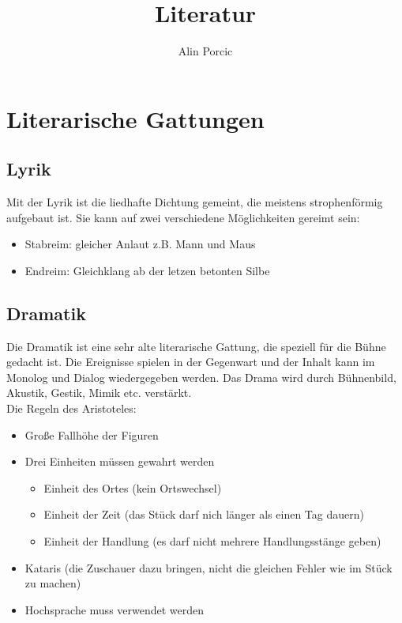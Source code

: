 \documentclass[12pt,a4paper]{article}
\title{Literatur}
\author{Alin Porcic}
\begin{document}
\maketitle
\newpage
\tableofcontents
\newpage

\section{Literarische Gattungen}
\subsection{Lyrik}

Mit der Lyrik ist die liedhafte Dichtung gemeint, die meistens strophenförmig aufgebaut ist. Sie kann auf zwei verschiedene Möglichkeiten gereimt sein:
	\begin{itemize}
	\item Stabreim: gleicher Anlaut z.B. Mann und Maus
	\item Endreim: Gleichklang ab der letzen betonten Silbe
	\end{itemize}

\subsection{Dramatik}

Die Dramatik ist eine sehr alte literarische Gattung, die speziell für die Bühne gedacht ist. Die Ereignisse spielen 
in der Gegenwart und der Inhalt kann im Monolog und Dialog wiedergegeben werden. Das Drama wird durch Bühnenbild, Akustik, Gestik, Mimik etc. verstärkt.\\

Die Regeln des Aristoteles:

	\begin{itemize}
	\item Große Fallhöhe der Figuren
	\item Drei Einheiten müssen gewahrt werden
		\begin{itemize}
		\item Einheit des Ortes (kein Ortswechsel)
		\item Einheit der Zeit (das Stück darf nich länger als einen Tag dauern)
		\item Einheit der Handlung (es darf nicht mehrere Handlungsstänge geben)
		\end{itemize}
	\item Kataris (die Zuschauer dazu bringen, nicht die gleichen Fehler wie im Stück zu machen)
	\item Hochsprache muss verwendet werden
	\end{itemize}
\end{document}
